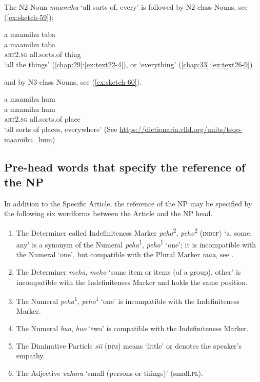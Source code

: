 \documentclass[output=paper]{langscibook}
\begin{document}
The N2 Noun \textit{maamihu} `all sorts of, every' is followed by N2-class Nouns, see (\ref{ex:sketch-59});

\ea\label{ex:sketch-59}
    a maamihu taba\\
    \gll a	maamihu	taba\\
    \textsc{art}2.\textsc{sg}	all.sorts.of	thing\\
    \glt `all the things' (\ref{chap:29}:\ref{ex:text22-4}), or `everything' (\ref{chap:33}:\ref{ex:text26-9})
\z

\noindent and by N3-class Nouns, see (\ref{ex:sketch-60}).
    
\ea\label{ex:sketch-60}
    a maamihu hum\\
    \gll a maamihu hum\\
    \textsc{art}2.\textsc{sg} all.sorts.of place\\
    \glt `all sorts of places, everywhere' (See \url{https://dictionaria.clld.org/units/teop-maamihu\_hum})
\z


\subsection{Pre-head words that specify the reference of the NP}\label{sec:preheadnp}
In addition to the Specific Article, the reference of the NP may be specified by the following six wordforms between the Article and the NP head.

\begin{enumerate}
    \item The Determiner called Indefiniteness Marker \textit{peha}\textsuperscript{2}, \textit{peho}\textsuperscript{2} (\textsc{indef}) `a, some, any' is a synonym of the Numeral \textit{peha}\textsuperscript{1}, \textit{peho}\textsuperscript{1} `one'; it is incompatible with the Numeral `one', but compatible with the Plural Marker \textit{maa}, see .
    \item The Determiner \textit{meha}, \textit{meho} `some item or items (of a group), other' is incompatible with the Indefiniteness Marker and holds the same position.
    \item The Numeral \textit{peha}\textsuperscript{1}, \textit{peho}\textsuperscript{1} `one' is incompatible with the Indefiniteness Marker.
    \item The Numeral \textit{bua}, \textit{buo} `two' is compatible with the Indefiniteness Marker.
    \item The Diminutive Particle \textit{sii} (\textsc{dim}) means `little' or denotes the speaker's empathy.
    \item The Adjective \textit{vahara} `small (persons or things)' (small.\textsc{pl}).
\end{enumerate}
\end{document}
